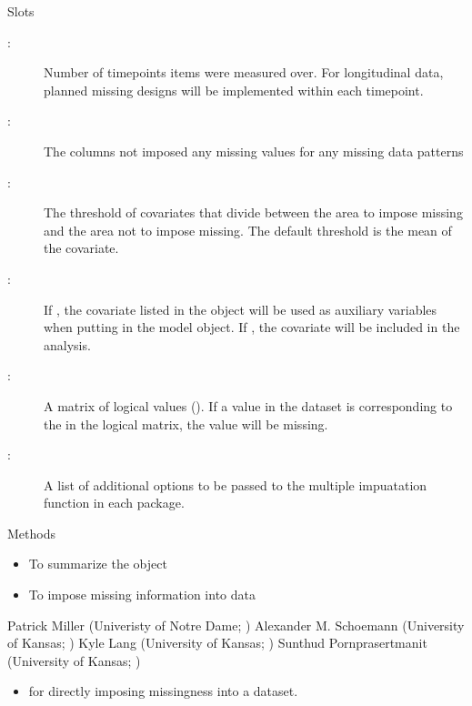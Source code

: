 \documentclass[a4paper]{book}
\begin{document}
\begin{Section}{Slots}
\begin{description}
\item[:] Number of timepoints items were measured over. For longitudinal data, planned missing designs will be implemented within each timepoint.
\item[:] The columns not imposed any missing values for any missing data patterns
\item[:] The threshold of covariates that divide between the area to impose missing and the area not to impose missing. The default threshold is the mean of the covariate.
\item[:] If , the covariate listed in the object will be used as auxiliary variables when putting in the model object. If , the covariate will be included in the analysis.
\item[:] A matrix of logical values (). If a value in the dataset is corresponding to the  in the logical matrix, the value will be missing.
\item[:] A list of additional options to be passed to the multiple impuatation function in each package.

\end{description}
  
\end{Section}
%
\begin{Section}{Methods}
\begin{itemize}

\item {} To summarize the object
\item {} To impose missing information into data

\end{itemize}

\end{Section}
%
\begin{Author}\relax
Patrick Miller (Univeristy of Notre Dame; )
Alexander M. Schoemann (University of Kansas; )  
Kyle Lang (University of Kansas; )
Sunthud Pornprasertmanit (University of Kansas; )
\end{Author}
%
\begin{SeeAlso}\relax
\begin{itemize}

\item {} for directly imposing missingness into a dataset.

\end{itemize}

\end{SeeAlso}
\end{document}
